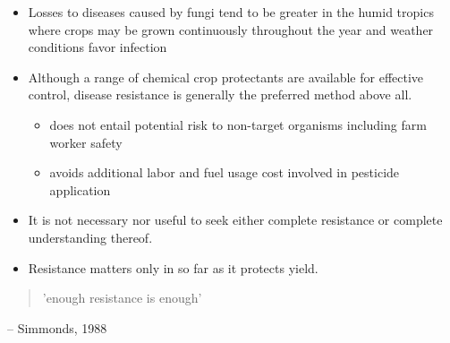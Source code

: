 \documentclass[11pt,dvipsnames,ignorenonframetext,aspectratio=169]{beamer}
\providecommand{\tightlist}{%
  \setlength{\itemsep}{0pt}\setlength{\parskip}{0pt}}
\begin{document}
\begin{frame}{}
\protect\hypertarget{section}{}
\begin{itemize}
\tightlist
\item
  Losses to diseases caused by fungi tend to be greater in the humid
  tropics where crops may be grown continuously throughout the year and
  weather conditions favor infection
\item
  Although a range of chemical crop protectants are available for
  effective control, disease resistance is generally the preferred
  method above all.

  \begin{itemize}
  \tightlist
  \item
    does not entail potential risk to non-target organisms including
    farm worker safety
  \item
    avoids additional labor and fuel usage cost involved in pesticide
    application
  \end{itemize}
\item
  It is not necessary nor useful to seek either complete resistance or
  complete understanding thereof.
\item
  Resistance matters only in so far as it protects yield.
\end{itemize}

\begin{quote}
'enough resistance is enough'
\end{quote}
\hfill\raggedright{-- Simmonds, 1988}
\end{frame}
\end{document}

